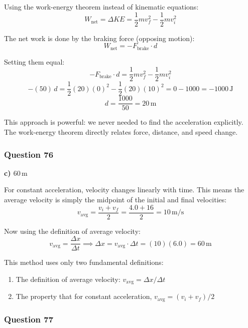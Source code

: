 \documentclass[12pt,letterpaper]{article}
\begin{document}
\begin{explanationbox}
Using the work-energy theorem instead of kinematic equations:
\[
W_{\text{net}} = \Delta KE = \frac{1}{2}mv_f^2 - \frac{1}{2}mv_i^2
\]

The net work is done by the braking force (opposing motion):
\[
W_{\text{net}} = -F_{\text{brake}} \cdot d
\]

Setting them equal:
\[
-F_{\text{brake}} \cdot d = \frac{1}{2}mv_f^2 - \frac{1}{2}mv_i^2
\]
\[
-(50)\,d = \frac{1}{2}(20)(0)^2 - \frac{1}{2}(20)(10)^2 = 0 - 1000 = -1000\,\text{J}
\]
\[
d = \frac{1000}{50} = 20\,\text{m}
\]

This approach is powerful: we never needed to find the acceleration explicitly. The work-energy theorem directly relates force, distance, and speed change.
\end{explanationbox}

\subsubsection*{Question 76}

\begin{answerbox}
\textbf{c) $60\,\text{m}$}
\end{answerbox}

\begin{explanationbox}
For constant acceleration, velocity changes linearly with time. This means the average velocity is simply the midpoint of the initial and final velocities:
\[
v_{\text{avg}} = \frac{v_i + v_f}{2} = \frac{4.0 + 16}{2} = 10\,\text{m/s}
\]

Now using the definition of average velocity:
\[
v_{\text{avg}} = \frac{\Delta x}{\Delta t} \implies \Delta x = v_{\text{avg}} \cdot \Delta t = (10)(6.0) = 60\,\text{m}
\]

This method uses only two fundamental definitions:
\begin{enumerate}
    \item The definition of average velocity: $v_{\text{avg}} = \Delta x / \Delta t$
    \item The property that for constant acceleration, $v_{\text{avg}} = (v_i + v_f)/2$
\end{enumerate}
\end{explanationbox}

\subsubsection*{Question 77}
\end{document}
